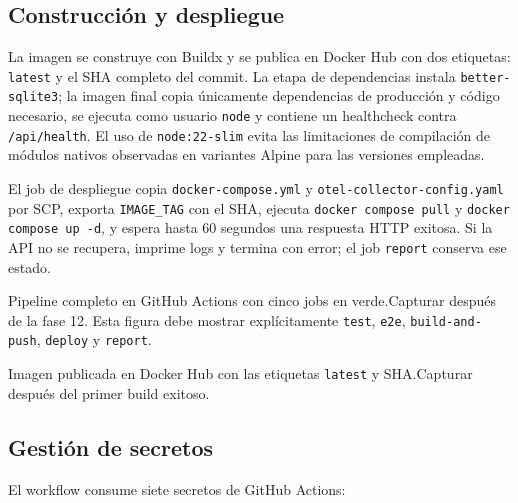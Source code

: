 \documentclass[12pt,a4paper]{article}
\begin{document}
\subsection{Construcción y despliegue}

La imagen se construye con Buildx y se publica en Docker Hub con dos etiquetas: \texttt{latest} y el SHA completo del commit. La etapa de dependencias instala \texttt{better-sqlite3}; la imagen final copia únicamente dependencias de producción y código necesario, se ejecuta como usuario \texttt{node} y contiene un healthcheck contra \texttt{/api/health}. El uso de \texttt{node:22-slim} evita las limitaciones de compilación de módulos nativos observadas en variantes Alpine para las versiones empleadas.

El job de despliegue copia \texttt{docker-compose.yml} y \texttt{otel-collector-config.yaml} por SCP, exporta \texttt{IMAGE\_TAG} con el SHA, ejecuta \texttt{docker compose pull} y \texttt{docker compose up -d}, y espera hasta 60 segundos una respuesta HTTP exitosa. Si la API no se recupera, imprime logs y termina con error; el job \texttt{report} conserva ese estado.

\begin{pendingfigure}{Pipeline completo en GitHub Actions con cinco jobs en verde.}{Capturar después de la fase 12. Esta figura debe mostrar explícitamente \texttt{test}, \texttt{e2e}, \texttt{build-and-push}, \texttt{deploy} y \texttt{report}.}
\label{fig:actions}
\end{pendingfigure}

\begin{pendingfigure}{Imagen publicada en Docker Hub con las etiquetas \texttt{latest} y SHA.}{Capturar después del primer build exitoso.}
\label{fig:dockerhub}
\end{pendingfigure}

\subsection{Gestión de secretos}

El workflow consume siete secretos de GitHub Actions:
\end{document}
